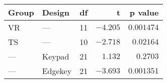 \begin{tabular}{llrrr}
\toprule
Group &   Design &  df &        t &    p value \\
\midrule
   VR &      --- &  11 & $-4.205$ & $0.001474$ \\
   TS &      --- &  10 & $-2.718$ &  $0.02164$ \\
  --- &   Keypad &  21 &  $1.132$ &   $0.2703$ \\
  --- &  Edgekey &  21 & $-3.693$ & $0.001351$ \\
\bottomrule
\end{tabular}
